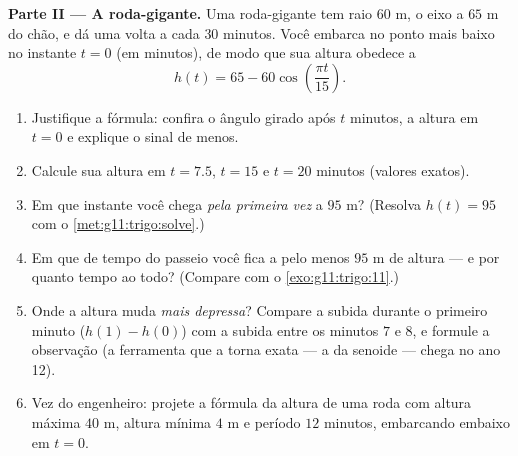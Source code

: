 \begin{problem}
\medskip
\noindent\textbf{Parte II --- A roda-gigante.}
Uma roda-gigante tem raio $60$ m, o eixo a $65$ m do chão, e dá
uma volta a cada $30$ minutos. Você embarca no ponto mais baixo no
instante $t = 0$ (em minutos), de modo que sua altura obedece a
\[
h(t) = 65 - 60 \cos\!\left(\frac{\pi t}{15}\right).
\]
\begin{enumerate}[resume]
  \item Justifique a fórmula: confira o ângulo girado após $t$
        minutos, a altura em $t = 0$ e explique o sinal de menos.
  \item Calcule sua altura em $t = 7.5$, $t = 15$ e $t = 20$
        minutos (valores exatos).
  \item Em que instante você chega \emph{pela primeira vez} a
        $95$ m? (Resolva $h(t) = 95$ com o
        \cref{met:g11:trigo:solve}.)
  \item Em que  de tempo do passeio você fica a pelo
        menos $95$ m de altura --- e por quanto tempo ao todo?
        (Compare com o \cref{exo:g11:trigo:11}.)
  \item Onde a altura muda \emph{mais depressa}? Compare a
        subida durante o primeiro minuto ($h(1) - h(0)$) com a
        subida entre os minutos $7$ e $8$, e formule a
        observação (a ferramenta que a torna exata --- a 
        da senoide --- chega no ano 12).
  \item Vez do engenheiro: projete a fórmula da altura de uma
        roda com altura máxima $40$ m, altura mínima $4$ m e
        período $12$ minutos, embarcando embaixo em $t = 0$.
\end{enumerate}


\end{problem}

